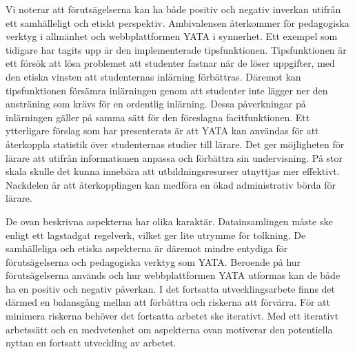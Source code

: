 Vi noterar att förutsägelserna kan ha både positiv och negativ inverkan utifrån ett samhälleligt och etiskt perspektiv. Ambivalensen återkommer för pedagogiska verktyg i allmänhet och webbplattformen YATA i synnerhet. Ett exempel som tidigare har tagits upp är den implementerade tipsfunktionen. Tipsfunktionen är ett försök att lösa problemet att studenter fastnar när de löser uppgifter, med den etiska vinsten att studenternas inlärning förbättras. Däremot kan tipsfunktionen försämra inlärningen genom att studenter inte lägger ner den ansträning som krävs för en ordentlig inlärning. Dessa påverkningar på inlärningen gäller på samma sätt för den föreslagna facitfunktionen. Ett ytterligare förslag som har presenterats är att YATA kan användas för att återkoppla statistik över studenternas studier till lärare. Det ger möjligheten för lärare att utifrån informationen anpassa och förbättra sin undervisning. På stor skala skulle det kunna innebära att utbildningsresurser utnyttjas mer effektivt. Nackdelen är att återkopplingen kan medföra en ökad administrativ börda för lärare.



De ovan beskrivna aspekterna har olika karaktär. Datainsamlingen måste ske enligt ett lagstadgat regelverk, vilket ger lite utrymme för tolkning. De samhälleliga och etiska aspekterna är däremot mindre entydiga för förutsägelserna och pedagogiska verktyg som YATA. Beroende på hur förutsägelserna används och hur webbplattformen YATA utformas kan de både ha en positiv och negativ påverkan. I det fortsatta utvecklingsarbete finns det därmed en balansgång mellan att förbättra och riskerna att förvärra. För att minimera riskerna behöver det fortsatta arbetet ske iterativt. Med ett iterativt arbetssätt och en medvetenhet om aspekterna ovan motiverar den potentiella nyttan en fortsatt utveckling av arbetet.
